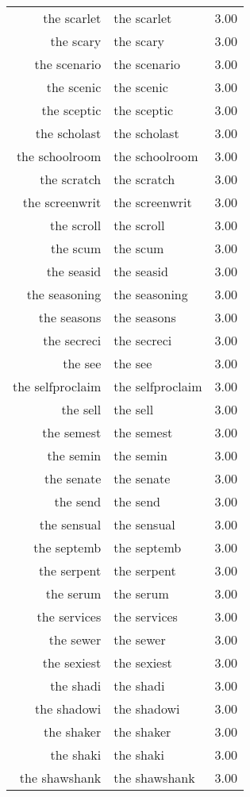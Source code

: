 \begin{table}[ht]
\begin{tabular}{rlr}
  the scarlet & the scarlet & 3.00 \\ 
  the scary & the scary & 3.00 \\ 
  the scenario & the scenario & 3.00 \\ 
  the scenic & the scenic & 3.00 \\ 
  the sceptic & the sceptic & 3.00 \\ 
  the scholast & the scholast & 3.00 \\ 
  the schoolroom & the schoolroom & 3.00 \\ 
  the scratch & the scratch & 3.00 \\ 
  the screenwrit & the screenwrit & 3.00 \\ 
  the scroll & the scroll & 3.00 \\ 
  the scum & the scum & 3.00 \\ 
  the seasid & the seasid & 3.00 \\ 
  the seasoning & the seasoning & 3.00 \\ 
  the seasons & the seasons & 3.00 \\ 
  the secreci & the secreci & 3.00 \\ 
  the see & the see & 3.00 \\ 
  the selfproclaim & the selfproclaim & 3.00 \\ 
  the sell & the sell & 3.00 \\ 
  the semest & the semest & 3.00 \\ 
  the semin & the semin & 3.00 \\ 
  the senate & the senate & 3.00 \\ 
  the send & the send & 3.00 \\ 
  the sensual & the sensual & 3.00 \\ 
  the septemb & the septemb & 3.00 \\ 
  the serpent & the serpent & 3.00 \\ 
  the serum & the serum & 3.00 \\ 
  the services & the services & 3.00 \\ 
  the sewer & the sewer & 3.00 \\ 
  the sexiest & the sexiest & 3.00 \\ 
  the shadi & the shadi & 3.00 \\ 
  the shadowi & the shadowi & 3.00 \\ 
  the shaker & the shaker & 3.00 \\ 
  the shaki & the shaki & 3.00 \\ 
  the shawshank & the shawshank & 3.00 \\ 

\end{tabular}
\end{table}
